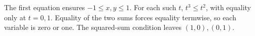 The first equation ensures $-1\le x,y\le1$. For each such $t$, $t^3\le t^2$, with equality only at $t=0,1$. Equality of the two sums forces equality termwise, so each variable is zero or one. The squared-sum condition leaves $\boxed{(1,0),(0,1)}$.
